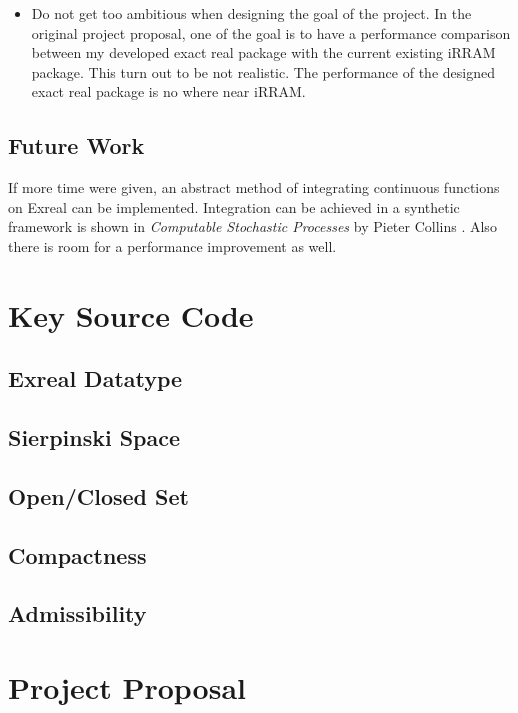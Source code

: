 \documentclass[12pt,twoside,notitlepage]{report}
\begin{document}
\begin{itemize}
\item Do not get too ambitious when designing the goal of the project. In the original project proposal, one of the goal is to have a performance comparison between my developed exact real package with the current existing iRRAM package. This turn out to be not realistic. The performance of the designed exact real package is no where near iRRAM.
\end{itemize}


\section{Future Work}

If more time were given, an abstract method of integrating continuous functions on Exreal can be implemented. Integration can be achieved in a synthetic framework is shown in \emph{Computable Stochastic Processes} by Pieter Collins \cite{collins4}.
Also there is room for a performance improvement as well. 


\cleardoublepage



\cleardoublepage

\appendix

\chapter{Key Source Code}

\section{Exreal Datatype}
{\scriptsize}

\section{Sierpinski Space}
{\scriptsize}

\section{Open/Closed Set}
{\scriptsize}

\section{Compactness}
{\scriptsize}

\section{Admissibility}
{\scriptsize}



\cleardoublepage

\chapter{Project Proposal}


\end{document}
